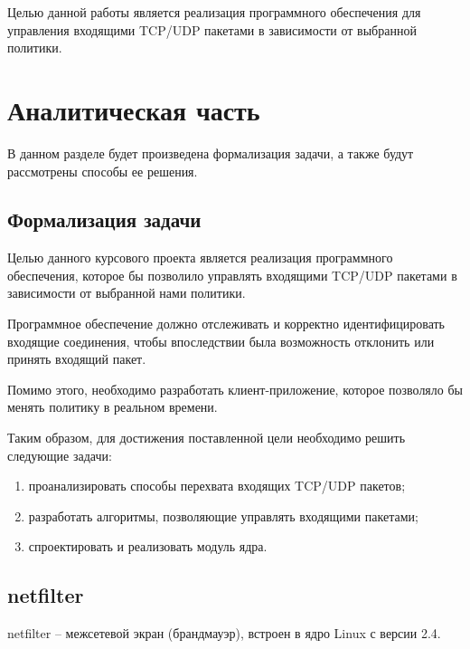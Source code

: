 Целью данной работы является реализация программного обеспечения для управления входящими TCP/UDP пакетами в зависимости от выбранной политики.


\newpage
\section*{Аналитическая часть}
В данном разделе будет произведена формализация задачи, а также будут рассмотрены способы ее решения.
\subsection*{Формализация задачи}
Целью данного курсового проекта является реализация программного обеспечения, которое бы позволило управлять входящими TCP/UDP пакетами в зависимости от выбранной нами политики.

Программное обеспечение должно отслеживать и корректно идентифицировать входящие соединения, чтобы впоследствии была возможность отклонить или принять входящий пакет.

Помимо этого, необходимо разработать клиент-приложение, которое позволяло бы менять политику в реальном времени.

Таким образом, для достижения поставленной цели необходимо решить следующие задачи:
\begin{enumerate}
	\item проанализировать способы перехвата входящих TCP/UDP пакетов;
	\item разработать алгоритмы, позволяющие управлять входящими пакетами;
	\item спроектировать и реализовать модуль ядра.
\end{enumerate}

\subsection*{netfilter}

netfilter -- межсетевой экран (брандмауэр), встроен в ядро Linux с версии 2.4.

